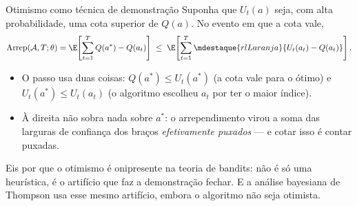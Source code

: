 \documentclass[aspectratio=169, 11pt]{beamer}
\newcommand{\arrep}{\mathrm{Arrep}}
\newcommand{\alg}{\mathcal{A}}
\begin{document}
\begin{frame}{Otimismo como técnica de demonstração}
  Suponha que $U_t(a)$ seja, com alta probabilidade, uma cota superior de
  $Q(a)$. No evento em que a cota vale,
  \[
    \arrep(\alg, T; \theta)
    = \E\!\left[\sum_{t=1}^{T} Q(a^{*}) - Q(a_t)\right]
    \;\le\;
    \E\!\left[\sum_{t=1}^{T}
      \mdestaque{rlLaranja}{U_t(a_t) - Q(a_t)}\right].
  \]

  \begin{itemize}
    \item O passo usa duas coisas: $Q(a^*) \le U_t(a^*)$ (a cota vale para
          o ótimo) e $U_t(a^*) \le U_t(a_t)$ (\alert{o algoritmo escolheu
          $a_t$ por ter o maior índice}).
    \item À direita não sobra nada sobre $a^*$: o arrependimento virou a
          soma das larguras de confiança dos braços \emph{efetivamente
          puxados} — e cotar isso é contar puxadas.
  \end{itemize}

  \begin{ideiabox}
    Eis por que o otimismo é onipresente na teoria de bandits: não é só uma
    heurística, é o artifício que faz a demonstração fechar. E a análise
    bayesiana de Thompson usa \alert{esse mesmo artifício}, embora o
    algoritmo não seja otimista.
  \end{ideiabox}
\end{frame}
\end{document}
